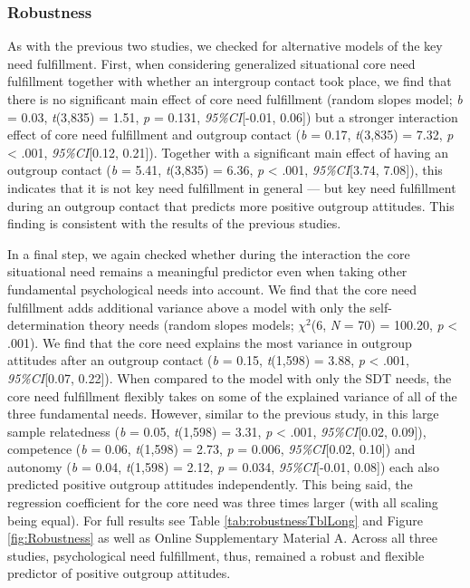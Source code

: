 \subsubsection{Robustness}

As with the previous two studies, we checked for alternative models of
the key need fulfillment. First, when considering generalized
situational core need fulfillment together with whether an intergroup
contact took place, we find that there is no significant main effect of
core need fulfillment (random slopes model; \textit{b} = 0.03,
\textit{t}(3,835) = 1.51, \textit{p} = 0.131, \textit{95\%CI}{[}-0.01,
0.06{]}) but a stronger interaction effect of core need fulfillment and
outgroup contact (\textit{b} = 0.17, \textit{t}(3,835) = 7.32,
\textit{p} \textless{} .001, \textit{95\%CI}{[}0.12, 0.21{]}). Together
with a significant main effect of having an outgroup contact (\textit{b}
= 5.41, \textit{t}(3,835) = 6.36, \textit{p} \textless{} .001,
\textit{95\%CI}{[}3.74, 7.08{]}), this indicates that it is not key need
fulfillment in general --- but key need fulfillment during an outgroup
contact that predicts more positive outgroup attitudes. This finding is
consistent with the results of the previous studies.

In a final step, we again checked whether during the interaction the
core situational need remains a meaningful predictor even when taking
other fundamental psychological needs into account. We find that the
core need fulfillment adds additional variance above a model with only
the self-determination theory needs (random slopes models; \(\chi^2\)(6,
\textit{N} = 70) = 100.20, \textit{p} \textless{} .001). We find that
the core need explains the most variance in outgroup attitudes after an
outgroup contact (\textit{b} = 0.15, \textit{t}(1,598) = 3.88,
\textit{p} \textless{} .001, \textit{95\%CI}{[}0.07, 0.22{]}). When
compared to the model with only the SDT needs, the core need fulfillment
flexibly takes on some of the explained variance of all of the three
fundamental needs. However, similar to the previous study, in this large
sample relatedness (\textit{b} = 0.05, \textit{t}(1,598) = 3.31,
\textit{p} \textless{} .001, \textit{95\%CI}{[}0.02, 0.09{]}),
competence (\textit{b} = 0.06, \textit{t}(1,598) = 2.73, \textit{p} =
0.006, \textit{95\%CI}{[}0.02, 0.10{]}) and autonomy (\textit{b} = 0.04,
\textit{t}(1,598) = 2.12, \textit{p} = 0.034, \textit{95\%CI}{[}-0.01,
0.08{]}) each also predicted positive outgroup attitudes independently.
This being said, the regression coefficient for the core need was three
times larger (with all scaling being equal). For full results see Table
\ref{tab:robustnessTblLong} and Figure \ref{fig:Robustness} as well as
Online Supplementary Material A. Across all three studies, psychological
need fulfillment, thus, remained a robust and flexible predictor of
positive outgroup attitudes.
